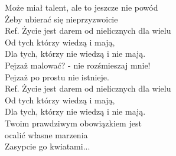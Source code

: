 
\begin{flushleft}
Może miał talent, ale to jeszcze nie powód \\
Żeby ubierać się nieprzyzwoicie \\
\vskip 3mm
Ref. Życie jest darem od nielicznych dla wielu\\
\hspace{0.9cm}Od tych którzy wiedzą i mają, \\
\hspace{0.9cm}Dla tych, którzy nie wiedzą i nie mają. \\
\vskip 3mm
Pejzaż malować? - nie rozśmieszaj mnie! \\
Pejzaż po prostu nie istnieje. \\
\vskip 3mm
Ref. Życie jest darem od nielicznych dla wielu\\
\hspace{0.9cm}Od tych którzy wiedzą i mają, \\
\hspace{0.9cm}Dla tych, którzy nie wiedzą i nie mają. \\
\vskip 3mm
Twoim prawdziwym obowiązkiem jest \\
ocalić własne marzenia \\
\vskip 3mm
Zasypcie go kwiatami... \\
\end{flushleft}
\clearpage
